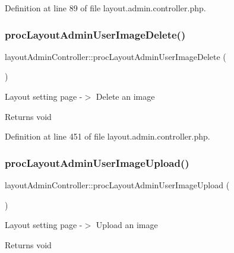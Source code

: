 Definition at line 89 of file layout.\+admin.\+controller.\+php.

\mbox{\label{classlayoutAdminController_a91dcd0368a7a3f85b2047d0d2546f14b}} 
\subsubsection{\texorpdfstring{proc\+Layout\+Admin\+User\+Image\+Delete()}{procLayoutAdminUserImageDelete()}}
{\footnotesize\ttfamily layout\+Admin\+Controller\+::proc\+Layout\+Admin\+User\+Image\+Delete (\begin{DoxyParamCaption}{ }\end{DoxyParamCaption})}

Layout setting page -\/$>$ Delete an image \begin{DoxyReturn}{Returns}
void 
\end{DoxyReturn}


Definition at line 451 of file layout.\+admin.\+controller.\+php.

\mbox{\label{classlayoutAdminController_a8883afdc3e36df910ff5c950d94f5919}} 
\subsubsection{\texorpdfstring{proc\+Layout\+Admin\+User\+Image\+Upload()}{procLayoutAdminUserImageUpload()}}
{\footnotesize\ttfamily layout\+Admin\+Controller\+::proc\+Layout\+Admin\+User\+Image\+Upload (\begin{DoxyParamCaption}{ }\end{DoxyParamCaption})}

Layout setting page -\/$>$ Upload an image \begin{DoxyReturn}{Returns}
void 
\end{DoxyReturn}


